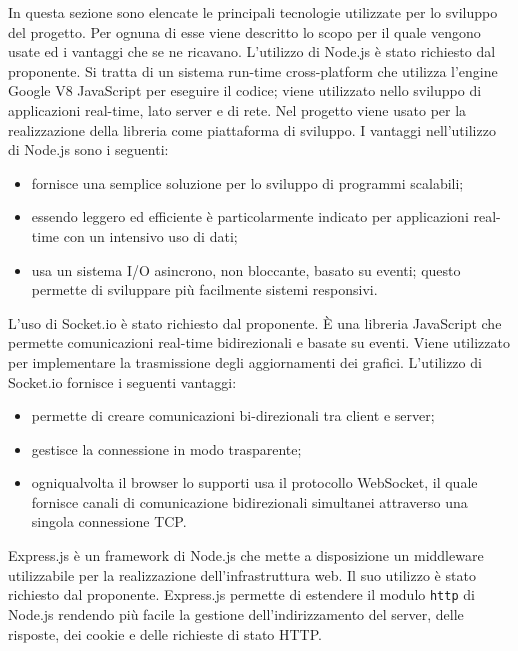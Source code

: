 In questa sezione sono elencate le principali tecnologie utilizzate per lo sviluppo del progetto. Per ognuna di esse viene descritto lo scopo per il quale vengono usate ed i vantaggi che se ne ricavano.
L'utilizzo di Node.js è stato richiesto dal proponente. Si tratta di un sistema run-time cross-platform che utilizza l'engine Google V8 JavaScript per eseguire il codice; viene utilizzato nello sviluppo di applicazioni real-time, lato server e di rete. Nel progetto viene usato per la realizzazione della libreria come piattaforma di sviluppo.
I vantaggi nell'utilizzo di Node.js sono i seguenti:
\begin{itemize}
\item fornisce una semplice soluzione per lo sviluppo di programmi scalabili;
\item essendo leggero ed efficiente è particolarmente indicato per applicazioni real-time con un intensivo uso di dati;
\item usa un sistema I/O asincrono, non bloccante, basato su eventi; questo permette di sviluppare più facilmente sistemi responsivi.
\end{itemize}

L'uso di Socket.io è stato richiesto dal proponente. È una libreria JavaScript che permette comunicazioni real-time bidirezionali e basate su eventi. Viene utilizzato per implementare la trasmissione degli aggiornamenti dei grafici.
L'utilizzo di Socket.io fornisce i seguenti vantaggi:
\begin{itemize}
\item permette di creare comunicazioni bi-direzionali tra client e server;
\item gestisce la connessione in modo trasparente;
\item ogniqualvolta il browser lo supporti usa il protocollo WebSocket, il quale fornisce canali di comunicazione bidirezionali simultanei attraverso una singola connessione TCP.
\end{itemize}

Express.js è un framework di Node.js che mette a disposizione un middleware utilizzabile per la realizzazione dell'infrastruttura web. Il suo utilizzo è stato richiesto dal proponente.
Express.js permette di estendere il modulo \texttt{http} di Node.js rendendo più facile la gestione dell'indirizzamento del server, delle risposte, dei cookie e delle richieste di stato HTTP.

